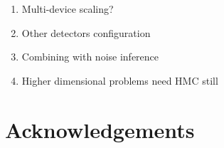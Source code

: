 \documentclass[twocolumn]{aastex631}
\begin{document}
\begin{enumerate}
    \item Multi-device scaling?
    \item Other detectors configuration
    \item  Combining with noise inference
    \item Higher dimensional problems need HMC still

\end{enumerate}

\section{Acknowledgements}


\end{document}
